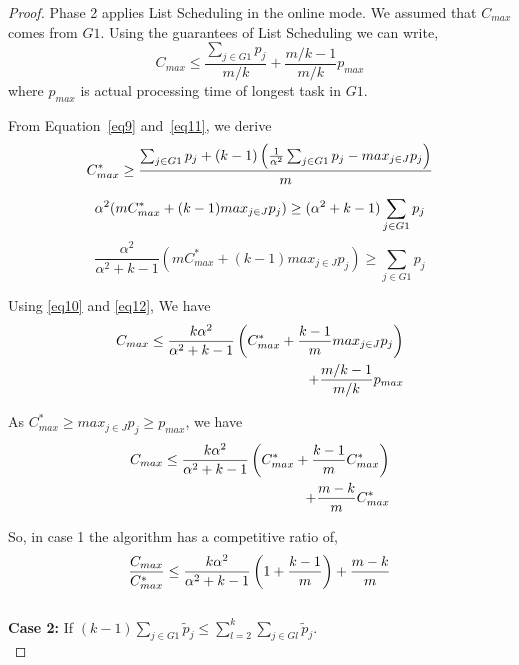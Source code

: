 \documentclass[twocolumn]{svjour3}
\begin{document}
\begin{proof}
  Phase 2 applies List Scheduling in the online mode. We assumed that
  $C_{max}$ comes from $G1$. Using the guarantees of List Scheduling
  we can write,
  \begin{equation}\label{eq10}
    C_{max} \leq \frac{\sum_{j \in G1 }^{}{{p_{j}}}}{m/k} + {\frac{m/k-1}{m/k}} p_{max}
  \end{equation}
  where $p_{max}$ is actual processing time of longest task in $G1$.

  From Equation~\ref{eq9} and~\ref{eq11}, we derive
  \begin{equation}{\nonumber}
    C_{max}^{*} \geq  \frac{\sum_{j \in G1 }^{}{{p_{j}}}+ (k-1)\left(\frac{1}{\alpha^{2}}\sum_{j \in G1 }^{}{{p_{j}}}-  {max_{j \in J}}{{p_{j}}}\right)}{m}
  \end{equation}
  \begin{equation}{\nonumber}
    \alpha^{2} (mC_{max}^{*} + (k-1){max_{j \in J}}{{p_{j}}}) \geq  (\alpha^{2} + k-1) \sum_{j \in G1 }^{}{{p_{j}}}  
  \end{equation}
  \begin{equation}\label{eq12}
    \frac{\alpha^{2}}{\alpha^{2}+k-1}\left(m C_{max}^{*}+(k-1) {max_{j \in J}}{{p_{j}}}\right) \geq \sum_{j \in G1 }^{}{{p_{j}}}  
  \end{equation}
  
  Using \ref{eq10} and \ref{eq12}, We have
  \begin{align}{\nonumber}
    C_{max} \leq \frac{k\alpha^{2}}{\alpha^{2}+k-1}\left( C_{max}^{*}+\frac{k-1}{m} {max_{j \in J}}{{p_{j}}}\right)\\
    + {\frac{m/k-1}{m/k}} p_{max} \nonumber
  \end{align}
  
  As $C_{max}^{*}\geq {{max_{j \in J}}{p_{j}}}\geq p_{max}$, we have
  \begin{align}{\nonumber}
    C_{max} \leq \frac{k\alpha^{2}}{\alpha^{2}+k-1}\left( C_{max}^{*}+ {\frac{k-1}{m}}{C_{max}^{*}}\right)\\
    + {\frac{m-k}{m}} C_{max}^{*} \nonumber
  \end{align}    
  
  So, in case 1 the algorithm has a competitive ratio of,
  \begin{equation}{\nonumber}
    \frac{C_{max}}{C_{max}^{*}} \leq \frac{k\alpha^{2}}{\alpha^{2}+k-1}\left( 1+ {\frac{k-1}{m}} \right) + {\frac{m-k}{m}} \end{equation}\\
  
  \textbf{Case 2:} If $(k-1)\sum_{j \in G1 }^{}{\tilde p_{j}} \leq \sum_{l=2}^{k}\sum_{j \in Gl }^{}{\tilde p_{j}}$. \\
  

\end{proof}
\end{document}
